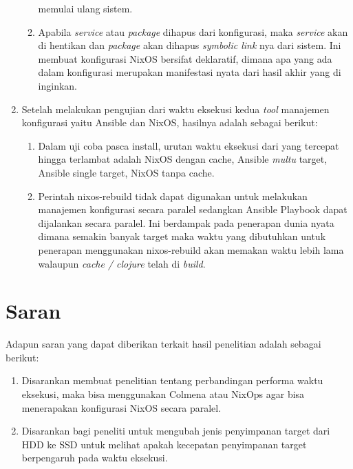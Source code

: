 \documentclass[10pt,]{report}
\begin{document}
\begin{adjustwidth}{20pt}{}
\begin{enumerate}[label=\arabic*.]
\begin{enumerate}[label=\alph*.]
          memulai ulang sistem. 
        \item Apabila \textit{service} atau \textit{package} dihapus dari 
          konfigurasi, maka \textit{service} akan di hentikan dan \textit{package}
          akan dihapus \textit{symbolic link} nya dari sistem. Ini membuat konfigurasi
          NixOS bersifat deklaratif, dimana apa yang ada dalam konfigurasi merupakan
          manifestasi nyata dari hasil akhir yang di inginkan.
    \end{enumerate}
  \item Setelah melakukan pengujian dari waktu eksekusi kedua \textit{tool} 
    manajemen konfigurasi yaitu Ansible dan NixOS, hasilnya adalah sebagai berikut:
    \begin{enumerate}[label=\alph*.]
      \item Dalam uji coba pasca install, urutan waktu eksekusi dari yang tercepat
        hingga terlambat adalah NixOS dengan cache, Ansible \textit{multu} target, 
        Ansible single target, NixOS tanpa cache.
      \item Perintah nixos-rebuild tidak dapat digunakan untuk melakukan manajemen 
        konfigurasi secara paralel sedangkan Ansible Playbook dapat dijalankan secara 
        paralel. Ini berdampak pada penerapan dunia nyata dimana semakin banyak 
        target maka waktu yang dibutuhkan untuk penerapan menggunakan nixos-rebuild 
        akan memakan waktu lebih lama walaupun \textit{cache / clojure} telah di 
        \textit{build}.
    \end{enumerate}
  \end{enumerate}
\end{adjustwidth}
\section{Saran}
\begin{adjustwidth}{20pt}{}
  \hspace\parindent
  Adapun saran yang dapat diberikan terkait hasil penelitian adalah sebagai berikut:
  \begin{enumerate}
    \item Disarankan membuat penelitian tentang perbandingan performa waktu eksekusi,
      maka bisa menggunakan Colmena atau NixOps agar bisa menerapakan konfigurasi NixOS 
      secara paralel.
    \item Disarankan bagi peneliti untuk mengubah jenis penyimpanan target dari HDD 
      ke SSD untuk melihat apakah kecepatan penyimpanan target berpengaruh pada waktu 
      eksekusi.
  \end{enumerate}
\end{adjustwidth}
\printbibliography[title={DAFTAR PUSTAKA}]
\end{document}
